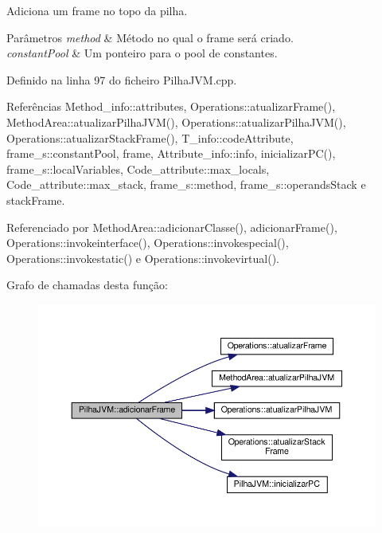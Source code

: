 Adiciona um frame no topo da pilha. 


\begin{DoxyParams}{Parâmetros}
{\em method} & Método no qual o frame será criado. \\
\hline
{\em constant\+Pool} & Um ponteiro para o pool de constantes. \\
\hline
\end{DoxyParams}


Definido na linha 97 do ficheiro Pilha\+J\+V\+M.\+cpp.



Referências Method\+\_\+info\+::attributes, Operations\+::atualizar\+Frame(), Method\+Area\+::atualizar\+Pilha\+J\+V\+M(), Operations\+::atualizar\+Pilha\+J\+V\+M(), Operations\+::atualizar\+Stack\+Frame(), T\+\_\+info\+::code\+Attribute, frame\+\_\+s\+::constant\+Pool, frame, Attribute\+\_\+info\+::info, inicializar\+P\+C(), frame\+\_\+s\+::local\+Variables, Code\+\_\+attribute\+::max\+\_\+locals, Code\+\_\+attribute\+::max\+\_\+stack, frame\+\_\+s\+::method, frame\+\_\+s\+::operands\+Stack e stack\+Frame.



Referenciado por Method\+Area\+::adicionar\+Classe(), adicionar\+Frame(), Operations\+::invokeinterface(), Operations\+::invokespecial(), Operations\+::invokestatic() e Operations\+::invokevirtual().

Grafo de chamadas desta função\+:\nopagebreak
\begin{figure}[H]
\begin{center}
\leavevmode
\includegraphics[width=350pt]{classPilhaJVM_a9add990f9c258d39d2fcd791398c96ac_cgraph}
\end{center}
\end{figure}
\mbox{\label{classPilhaJVM_a6a47624a1e9923e59258454e6e6d1271}} 
